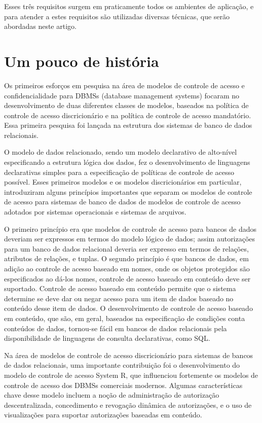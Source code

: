 \documentclass{article}
\begin{document}
Esses três requisitos surgem em praticamente todos os ambientes de aplicação, e para atender a estes requisitos são utilizadas diversas técnicas, que serão abordadas neste artigo.

\section{Um pouco de história}

Os primeiros esforços em pesquisa na área de modelos de controle de acesso e confidencialidade para DBMSs (database management systems) focaram no desenvolvimento de duas diferentes classes de modelos, baseados na política de controle de acesso discricionário e na política de controle de acesso mandatório. Essa primeira pesquisa foi lançada na estrutura dos sistemas de banco de dados relacionais.

O modelo de dados relacionado, sendo um modelo declarativo de alto-nível especificando a estrutura lógica dos dados, fez o desenvolvimento de linguagens declarativas simples para a especificação de políticas de controle de acesso possível. Esses primeiros modelos e os modelos discricionários em particular, introduziram alguns princípios importantes que separam os modelos de controle de acesso para sistemas de banco de dados de modelos de controle de acesso adotados por sistemas operacionais e sistemas de arquivos.

O primeiro princípio era que modelos de controle de acesso para bancos de dados deveriam ser expressos em termos do modelo lógico de dados; assim autorizações para um banco de dados relacional deveria ser expresso em termos de relações, atributos de relações, e tuplas. O segundo princípio é que bancos de dados, em adição ao controle de acesso baseado em nomes, onde os objetos protegidos são especificados ao dá-los nomes, controle de acesso baseado em conteúdo deve ser suportado. Controle de acesso baseado em conteúdo permite que o sistema determine se deve dar ou negar acesso para um item de dados baseado no conteúdo desse item de dados. O desenvolvimento de controle de acesso baseado em conteúdo, que são, em geral, baseados na especificação de condições conta conteúdos de dados, tornou-se fácil em bancos de dados relacionais pela disponibilidade de linguagens de consulta declarativas, como SQL.

Na área de modelos de controle de acesso discricionário para sistemas de bancos de dados relacionais, uma importante contribuição foi o desenvolvimento do modelo de controle de acesso System R, que influenciou fortemente os modelos de controle de acesso dos DBMSs comerciais modernos. Algumas características chave desse modelo incluem a noção de administração de autorização descentralizada, concedimento e revogação dinâmica de autorizações, e o uso de visualizações para suportar autorizações baseadas em conteúdo.
\end{document}
